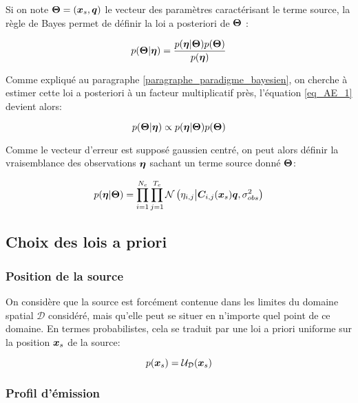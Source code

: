Si on note ${\bm{\Theta}} = ({\bm{x}_s}, {\bm{q}})$ le vecteur des paramètres caractérisant le terme source, la règle de Bayes permet {de définir} la loi a posteriori de ${\bm{\Theta}}$ : 

\begin{equation}
p({\bm{\Theta}} | {\bm{\eta}}) = \dfrac{p({\bm{\eta}} | {\bm{\Theta}})p({\bm{\Theta}})}{p({\bm{\eta}})}
\label{eq_AE_1}
\end{equation}

Comme expliqué au paragraphe \ref{paragraphe_paradigme_bayesien}, on cherche à estimer cette loi a posteriori à un facteur multiplicatif près, l'équation \eqref{eq_AE_1} devient alors:

\begin{equation}
{
p({\bm{\Theta}}| {\bm{\eta}}) \propto p({\bm{\eta}}| {\bm{\Theta}})p({\bm{\Theta}})
}
\label{eq_AE_1_prop}
\end{equation}

\newpage Comme {le vecteur d'erreur est supposé gaussien centré}, on peut alors définir la vraisemblance des observations ${\bm{\eta}}$ sachant un terme source donné ${\bm{\Theta}}$:

\begin{equation}
p({\bm{\eta}} | {\bm{\Theta}}) = \prod\limits_{i=1}^{N_c} \prod\limits_{j=1}^{T_c}\mathcal{N}\left({\eta}_{i,j} \middle\vert {\bm{C}}_{i,j}({\bm{x}_s}){\bm{q}}, {\sigma_{obs}^2}\right)
\label{eq_AE_5}
\end{equation}

\subsection{Choix des lois a priori}

\subsubsection{Position de la source}

On considère que la source est forcément contenue dans les limites du domaine spatial $\mathcal{D}$ considéré, mais qu'elle peut se situer en n'importe quel point de ce domaine. En termes probabilistes, cela se traduit par une loi a priori uniforme sur la position ${\bm{x}_s}$ de la source:

\begin{equation}
p({\bm{x}_s}) = \mathcal{U}_\mathcal{D}({\bm{x}_s})
\label{eq_AE_7}
\end{equation}


\subsubsection{Profil d'émission}

